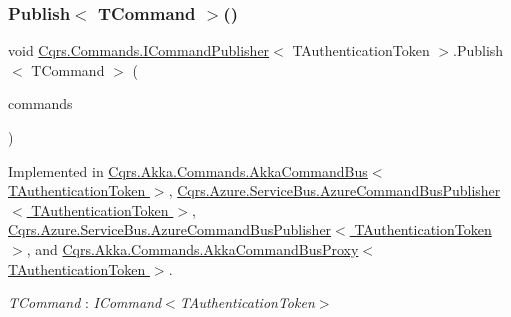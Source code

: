 \subsubsection{\texorpdfstring{Publish$<$ T\+Command $>$()}{Publish< TCommand >()}\hspace{0.1cm}{\footnotesize\ttfamily [2/2]}}
{\footnotesize\ttfamily void \hyperlink{interfaceCqrs_1_1Commands_1_1ICommandPublisher}{Cqrs.\+Commands.\+I\+Command\+Publisher}$<$ T\+Authentication\+Token $>$.Publish$<$ T\+Command $>$ (\begin{DoxyParamCaption}\item[{I\+Enumerable$<$ T\+Command $>$}]{commands }\end{DoxyParamCaption})}



Implemented in \hyperlink{classCqrs_1_1Akka_1_1Commands_1_1AkkaCommandBus_ab52365375febd74ac078e97af6e6cd24_ab52365375febd74ac078e97af6e6cd24}{Cqrs.\+Akka.\+Commands.\+Akka\+Command\+Bus$<$ T\+Authentication\+Token $>$}, \hyperlink{classCqrs_1_1Azure_1_1ServiceBus_1_1AzureCommandBusPublisher_a072f18c8709e0ae61056e34251afc506_a072f18c8709e0ae61056e34251afc506}{Cqrs.\+Azure.\+Service\+Bus.\+Azure\+Command\+Bus\+Publisher$<$ T\+Authentication\+Token $>$}, \hyperlink{classCqrs_1_1Azure_1_1ServiceBus_1_1AzureCommandBusPublisher_a072f18c8709e0ae61056e34251afc506_a072f18c8709e0ae61056e34251afc506}{Cqrs.\+Azure.\+Service\+Bus.\+Azure\+Command\+Bus\+Publisher$<$ T\+Authentication\+Token $>$}, and \hyperlink{classCqrs_1_1Akka_1_1Commands_1_1AkkaCommandBusProxy_a81dc8162ca933d84b6aee04aff589010_a81dc8162ca933d84b6aee04aff589010}{Cqrs.\+Akka.\+Commands.\+Akka\+Command\+Bus\+Proxy$<$ T\+Authentication\+Token $>$}.

\begin{Desc}
\item[Type Constraints]\begin{description}
\item[{\em T\+Command} : {\em I\+Command$<$T\+Authentication\+Token$>$}]\end{description}
\end{Desc}
